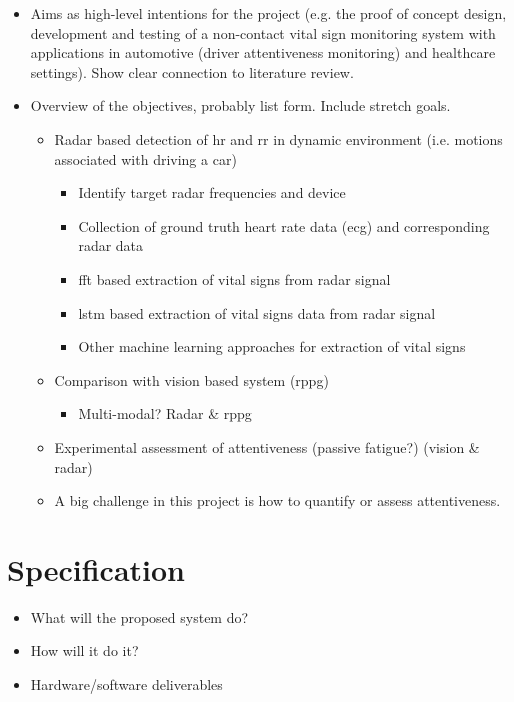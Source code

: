 \documentclass[11pt, parskip=half*,twoside=false]{scrbook}
\begin{document}
{\begin{itemize}
	\item Aims as high-level intentions for the project (e.g. the proof of concept design, development and testing of a non-contact vital sign monitoring system with applications in automotive (driver attentiveness monitoring) and healthcare settings). Show clear connection to literature review. 
	\item Overview of the objectives, probably list form. Include stretch goals.
	\begin{itemize}
		\item Radar based detection of \gls{hr} and \gls{rr} in dynamic environment (i.e. motions associated with driving a car)
		\begin{itemize}
			\item Identify target radar frequencies and device
			\item Collection of ground truth heart rate data (\gls{ecg}) and corresponding radar data
			\item \gls{fft} based extraction of vital signs from radar signal
			\item \gls{lstm} based extraction of vital signs data from radar signal
			\item Other machine learning approaches for extraction of vital signs
		\end{itemize}
		\item Comparison with vision based system (\gls{rppg})
		\begin{itemize}
			\item Multi-modal? Radar \& \gls{rppg}
		\end{itemize}
		\item Experimental assessment of attentiveness (passive fatigue?) (vision \& radar)
		\item A big challenge in this project is how to quantify or assess attentiveness. 
	\end{itemize}
\end{itemize}

\section{Specification}
\begin{itemize}
	\item What will the proposed system do?
	\item How will it do it?
	\item Hardware/software deliverables
\end{itemize}

}
\end{document}
